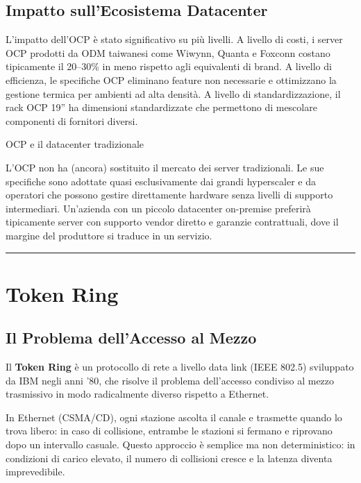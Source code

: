 \documentclass[
  italian,
  openany]{book}
\begin{document}
\subsection{Impatto sull'Ecosistema
Datacenter}\label{impatto-sullecosistema-datacenter}

L'impatto dell'OCP è stato significativo su più livelli. A livello di
costi, i server OCP prodotti da ODM taiwanesi come Wiwynn, Quanta e
Foxconn costano tipicamente il 20--30\% in meno rispetto agli
equivalenti di brand. A livello di efficienza, le specifiche OCP
eliminano feature non necessarie e ottimizzano la gestione termica per
ambienti ad alta densità. A livello di standardizzazione, il rack OCP
19'' ha dimensioni standardizzate che permettono di mescolare componenti
di fornitori diversi.

\begin{calloutnote}{OCP e il datacenter tradizionale}

L'OCP non ha (ancora) sostituito il mercato dei server tradizionali. Le
sue specifiche sono adottate quasi esclusivamente dai grandi hyperscaler
e da operatori che possono gestire direttamente hardware senza livelli
di supporto intermediari. Un'azienda con un piccolo datacenter
on-premise preferirà tipicamente server con supporto vendor diretto e
garanzie contrattuali, dove il margine del produttore si traduce in un
servizio.

\end{calloutnote}

\begin{center}\rule{0.5\linewidth}{0.5pt}\end{center}

\section{Token Ring}\label{token-ring}

\subsection{Il Problema dell'Accesso al
Mezzo}\label{il-problema-dellaccesso-al-mezzo}

Il \textbf{Token Ring} è un protocollo di rete a livello data link (IEEE
802.5) sviluppato da IBM negli anni '80, che risolve il problema
dell'accesso condiviso al mezzo trasmissivo in modo radicalmente diverso
rispetto a Ethernet.

In Ethernet (CSMA/CD), ogni stazione ascolta il canale e trasmette
quando lo trova libero: in caso di collisione, entrambe le stazioni si
fermano e riprovano dopo un intervallo casuale. Questo approccio è
semplice ma non deterministico: in condizioni di carico elevato, il
numero di collisioni cresce e la latenza diventa imprevedibile.
\end{document}
